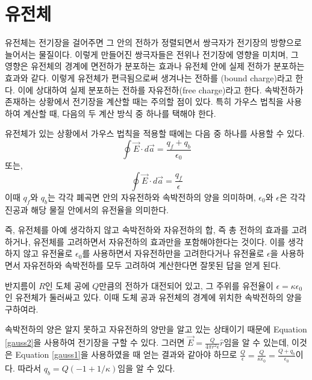 \section{유전체}



유전체는 전기장을 걸어주면 그 안의 전하가 정렬되면서 쌍극자가 전기장의 방향으로 늘어서는 물질이다. 이렇게 만들어진 쌍극자들은 전위나 전기장에 영향을 미치며, 그 영향은 유전체의 경계에 면전하가 분포하는 효과나 유전체 안에 실제 전하가 분포하는 효과와 같다. 이렇게 유전체가 편극됨으로써 생겨나는 전하를 (bound charge)라고 한다. 이에 상대하여 실제 분포하는 전하를 자유전하(free charge)라고 한다.
속박전하가 존재하는 상황에서 전기장을 계산할 때는 주의할 점이 있다. 특히 가우스 법칙을 사용하여 계산할 때, 다음의 두 계산 방식 중 하나를 택해야 한다.
\begin{theorem}
유전체가 있는 상황에서 가우스 법칙을 적용할 때에는 다음 중 하나를 사용할 수 있다.
\begin{equation}\label{gauss1} \oint \vec{E} \cdot d\vec{a} = \frac{q_{f}+q_{b}}{\epsilon_0} \end{equation}
또는,
\begin{equation}\label{gauss2} \oint \vec{E} \cdot d\vec{a} = \frac{q_{f}}{\epsilon} \end{equation}
이때 $q_{f}$와 $q_{b}$는 각각 폐곡면 안의 자유전하와 속박전하의 양을 의미하며, $\epsilon_0$와 $\epsilon$은 각각 진공과 해당 물질 안에서의 유전율을 의미한다.
\end{theorem}
즉, 유전체를 아예 생각하지 않고 속박전하와 자유전하의 합, 즉 총 전하의 효과를 고려하거나, 유전체를 고려하면서 자유전하의 효과만을 포함해야한다는 것이다. 이를 생각하지 않고 유전율로 $\epsilon_0$를 사용하면서 자유전하만을 고려한다거나 유전율로 $\epsilon$을 사용하면서 자유전하와 속박전하를 모두 고려하여 계산한다면 잘못된 답을 얻게 된다.

\begin{example}
반지름이 $R$인 도체 공에 $Q$만큼의 전하가 대전되어 있고, 그 주위를 유전율이 $\epsilon=\kappa\epsilon_0$인 유전체가 둘러싸고 있다. 이때 도체 공과 유전체의 경계에 위치한 속박전하의 양을 구하여라.
\end{example}
속박전하의 양은 알지 못하고 자유전하의 양만을 알고 있는 상태이기 때문에 Equation \ref{gauss2}을 사용하여 전기장을 구할 수 있다. 그러면 $\vec{E}=\frac{Q}{4\pi r^2\epsilon}\hat{r}$임을 알 수 있는데, 이것은 Equation \ref{gauss1}을 사용하였을 때 얻는 결과와 같아야 하므로 $\frac{Q}{\epsilon}=\frac{Q}{\kappa\epsilon_0}=\frac{Q+q_b}{\epsilon_0}$이다. 따라서 $q_b = Q(-1+1/\kappa)$임을 알 수 있다.

